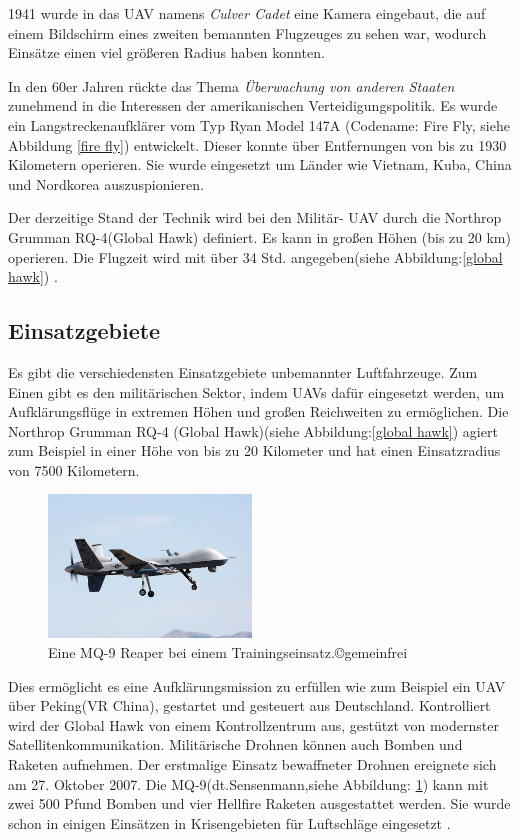 1941 wurde in das \ac{UAV} namens \textit{Culver Cadet} eine Kamera eingebaut, die auf einem Bildschirm eines zweiten bemannten Flugzeuges zu sehen war, wodurch Einsätze einen viel größeren Radius haben konnten.

In den 60er Jahren rückte das Thema \emph{Überwachung von anderen Staaten} zunehmend in die Interessen der amerikanischen Verteidigungspolitik. Es wurde ein Langstreckenaufklärer vom Typ Ryan Model 147A (Codename: Fire Fly, siehe Abbildung \ref{fire fly}) entwickelt. Dieser konnte über Entfernungen von bis zu 1930 Kilometern operieren. Sie wurde eingesetzt um Länder wie Vietnam, Kuba, China und Nordkorea auszuspionieren.\cite{FireFly}

Der derzeitige Stand der Technik wird bei den Militär- \ac{UAV} durch die Northrop Grumman RQ-4(Global Hawk) definiert. Es kann in großen Höhen (bis zu 20 km) operieren. Die Flugzeit wird mit über 34 Std. angegeben(siehe Abbildung:\ref{global hawk}) \cite{rq-4}.


\subsection{Einsatzgebiete}
Es gibt die verschiedensten Einsatzgebiete unbemannter Luftfahrzeuge. Zum Einen gibt es den militärischen Sektor, indem \acp{UAV} dafür eingesetzt werden, um Aufklärungsflüge in extremen Höhen und großen Reichweiten zu ermöglichen. Die Northrop Grumman RQ-4 (Global Hawk)(siehe Abbildung:\ref{global hawk}) agiert zum Beispiel in einer Höhe von bis zu 20 Kilometer und hat einen Einsatzradius von 7500 Kilometern.

\begin{figure}
  \begin{center}
    \includegraphics[width=0.48\textwidth]{img/reaper.jpg}
  \end{center}
  \caption{Eine MQ-9 Reaper bei einem Trainingseinsatz.©gemeinfrei}
  \label{reaper}
\end{figure}

Dies ermöglicht es eine Aufklärungsmission zu erfüllen wie zum Beispiel ein \ac{UAV} über Peking(VR China), gestartet und gesteuert aus Deutschland. Kontrolliert wird der Global Hawk von einem Kontrollzentrum aus, gestützt von modernster Satellitenkommunikation.
Militärische Drohnen können auch Bomben und Raketen aufnehmen. Der erstmalige Einsatz bewaffneter Drohnen ereignete sich am 27. Oktober 2007. Die \ac{MQ-9}(dt.Sensenmann,siehe Abbildung: \ref{reaper}) kann mit zwei 500 Pfund Bomben und vier Hellfire Raketen ausgestattet werden. Sie wurde schon in einigen Einsätzen in Krisengebieten für Luftschläge eingesetzt \cite{MQ-9}.

